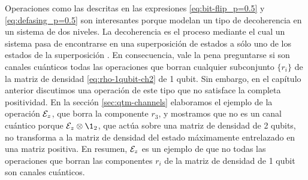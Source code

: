 
Operaciones como las descritas en las expresiones \eqref{eq:bit-flip_p=0.5}
y \eqref{eq:defasing_p=0.5} son interesantes porque modelan
un tipo de decoherencia en un sistema de dos niveles.
La decoherencia es el proceso mediante el cual un sistema 
pasa de encontrarse en una superposición de estados a sólo
uno de los estados de la superposición \cite{zeh1970interpretation}. 
En consecuencia, vale la pena preguntarse si son canales cuánticos
todas las operaciones que borran cualquier subconjunto $\{r_i\}$ 
de la matriz de densidad \eqref{eq:rho-1qubit-ch2} de 1 qubit.
Sin embargo, en el capítulo anterior discutimos una operación de 
este tipo que no satisface la completa positividad.
En la sección \ref{sec:qtm-channels} elaboramos el ejemplo de la operación $\mathcal{E}_z$,
que borra la componente $r_3$, y mostramos que no es un canal 
cuántico porque $\E_z\ot\1_2$, que actúa sobre una matriz de densidad de 2 qubits,
no transforma a la matriz de densidad del estado máximamente entrelazado 
en una matriz positiva.
En resumen, $\mathcal{E}_z$ es un ejemplo de que no todas las operaciones 
que borran las componentes $r_i$ de la matriz de densidad de 1 qubit
son canales cuánticos.


